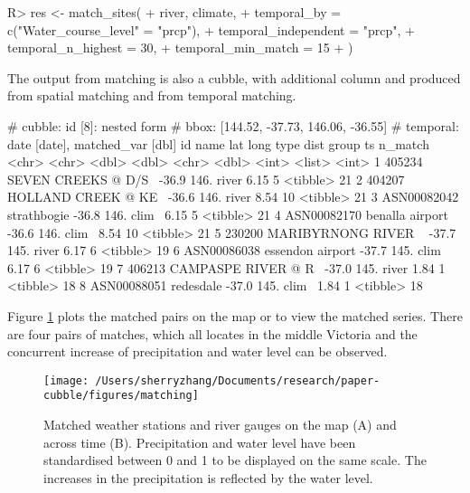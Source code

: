 \documentclass[
]{jss}
\begin{document}
\begin{CodeChunk}
\begin{CodeInput}
R> res <- match_sites(
+   river, climate,
+   temporal_by = c("Water_course_level" = "prcp"),
+   temporal_independent = "prcp",  
+   temporal_n_highest = 30,
+   temporal_min_match = 15
+ )
\end{CodeInput}
\end{CodeChunk}

The output from matching is also a cubble, with additional column  and  produced from spatial matching and  from temporal matching.

\begin{CodeChunk}
\begin{CodeOutput}
# cubble:   id [8]: nested form
# bbox:     [144.52, -37.73, 146.06, -36.55]
# temporal: date [date], matched_var [dbl]
  id          name                  lat  long type   dist group ts       n_match
  <chr>       <chr>               <dbl> <dbl> <chr> <dbl> <int> <list>     <int>
1 405234      SEVEN CREEKS @ D/S~ -36.9  146. river  6.15     5 <tibble>      21
2 404207      HOLLAND CREEK @ KE~ -36.6  146. river  8.54    10 <tibble>      21
3 ASN00082042 strathbogie         -36.8  146. clim~  6.15     5 <tibble>      21
4 ASN00082170 benalla airport     -36.6  146. clim~  8.54    10 <tibble>      21
5 230200      MARIBYRNONG RIVER ~ -37.7  145. river  6.17     6 <tibble>      19
6 ASN00086038 essendon airport    -37.7  145. clim~  6.17     6 <tibble>      19
7 406213      CAMPASPE RIVER @ R~ -37.0  145. river  1.84     1 <tibble>      18
8 ASN00088051 redesdale           -37.0  145. clim~  1.84     1 <tibble>      18
\end{CodeOutput}
\end{CodeChunk}

Figure \ref{fig:matching} plots the matched pairs on the map or to view the matched series. There are four pairs of matches, which all locates in the middle Victoria and the concurrent increase of precipitation and water level can be observed.

\begin{CodeChunk}
\begin{figure}

{\centering \texttt{[image: /Users/sherryzhang/Documents/research/paper-cubble/figures/matching]} 

}

\caption[Matched weather stations and river gauges on the map (A) and across time (B)]{Matched weather stations and river gauges on the map (A) and across time (B). Precipitation and water level have been standardised between 0 and 1 to be displayed on the same scale. The increases in the precipitation is reflected by the water level.}\label{fig:matching}
\end{figure}
\end{CodeChunk}
\end{document}
